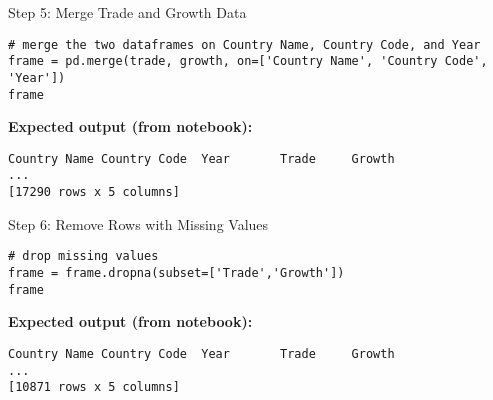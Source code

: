 \documentclass[notes,11pt, aspectratio=169, xcolor=table]{beamer}
\begin{document}
\begin{frame}[fragile]{Step 5: Merge Trade and Growth Data}
\begin{verbatim}
# merge the two dataframes on Country Name, Country Code, and Year
frame = pd.merge(trade, growth, on=['Country Name', 'Country Code', 'Year'])
frame
\end{verbatim}
\vspace{0.5ex}
\textbf{Expected output (from notebook):}
\begin{verbatim}
Country Name Country Code  Year       Trade     Growth
...
[17290 rows x 5 columns]
\end{verbatim}
\end{frame}

\begin{frame}[fragile]{Step 6: Remove Rows with Missing Values}
\begin{verbatim}
# drop missing values
frame = frame.dropna(subset=['Trade','Growth'])
frame
\end{verbatim}
\vspace{0.5ex}
\textbf{Expected output (from notebook):}
\begin{verbatim}
Country Name Country Code  Year       Trade     Growth
...
[10871 rows x 5 columns]
\end{verbatim}
\end{frame}
\end{document}
